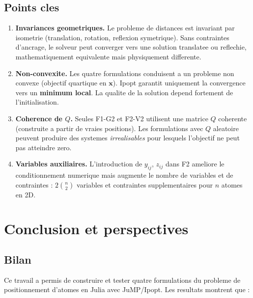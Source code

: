 \documentclass[12pt,a4paper]{article}
\begin{document}
\subsection{Points cles}

\begin{enumerate}
  \item \textbf{Invariances geometriques.}
    Le probleme de distances est invariant par isometrie
    (translation, rotation, reflexion symetrique).
    Sans contraintes d'ancrage, le solveur peut converger vers une
    solution translatee ou reflechie, mathematiquement equivalente mais
    physiquement differente.

  \item \textbf{Non-convexite.}
    Les quatre formulations conduisent a un probleme non convexe
    (objectif quartique en $\mathbf{x}$).
    Ipopt garantit uniquement la convergence vers un
    \textbf{minimum local}.
    La qualite de la solution depend fortement de l'initialisation.

  \item \textbf{Coherence de $Q$.}
    Seules F1-G2 et F2-V2 utilisent une matrice $Q$ coherente
    (construite a partir de vraies positions).
    Les formulations avec $Q$ aleatoire peuvent produire des systemes
    \textit{irrealisables} pour lesquels l'objectif ne peut pas
    atteindre zero.

  \item \textbf{Variables auxiliaires.}
    L'introduction de $y_{ij}$, $z_{ij}$ dans F2 ameliore le
    conditionnement numerique mais augmente le nombre de variables et
    de contraintes : $2\binom{n}{2}$ variables et contraintes
    supplementaires pour $n$ atomes en 2D.
\end{enumerate}

\section{Conclusion et perspectives}

\subsection{Bilan}

Ce travail a permis de construire et tester quatre formulations du
probleme de positionnement d'atomes en Julia avec JuMP/Ipopt.
Les resultats montrent que :
\end{document}
